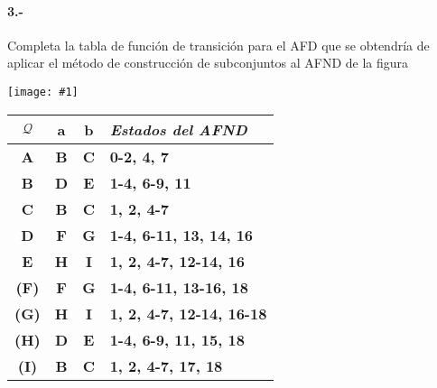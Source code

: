 \documentclass[11pt,a4paper,table,answers]{exam} %
\newcommand{\h}[1]{\ifprintanswers\textcolor{azul}{\bf#1}\else{\phantom{\bf#1}}\fi}
\newcommand{\myincludegraphics}[1]{%
\begin{center}
\begin{adjustbox}{max size={\textwidth}{\textheight}}
    \texttt{[image: \#1]}
\end{adjustbox}
\end{center}
} %
\begin{document}
\paragraph{3.-}\label{p3}
Completa la tabla de función de transición para el AFD que se obtendría de aplicar el método de construcción de subconjuntos al AFND de la figura
    \myincludegraphics{}
\begin{tabular} {c@{\hspace{4mm}}cc@{\hspace{4mm}}l}
\toprule %
$\mathcal{Q}$ & a & b & \emph{Estados del AFND}\\
\midrule %
\h{A} & \h{B} & \h{C} & \h{0-2, 4, 7}\\
\h{B} & \h{D} & \h{E} & \h{1-4, 6-9, 11}\\
\h{C} & \h{B} & \h{C} & \h{1, 2, 4-7}\\
\h{D} & \h{F} & \h{G} & \h{1-4, 6-11, 13, 14, 16}\\
\h{E} & \h{H} & \h{I} & \h{1, 2, 4-7, 12-14, 16}\\
\h{(F)} & \h{F} & \h{G} & \h{1-4, 6-11, 13-16, 18}\\
\h{(G)} & \h{H} & \h{I} & \h{1, 2, 4-7, 12-14, 16-18}\\
\h{(H)} & \h{D} & \h{E} & \h{1-4, 6-9, 11, 15, 18}\\
\h{(I)} & \h{B} & \h{C} & \h{1, 2, 4-7, 17, 18}\\
\bottomrule %
\end{tabular}
\end{document}
